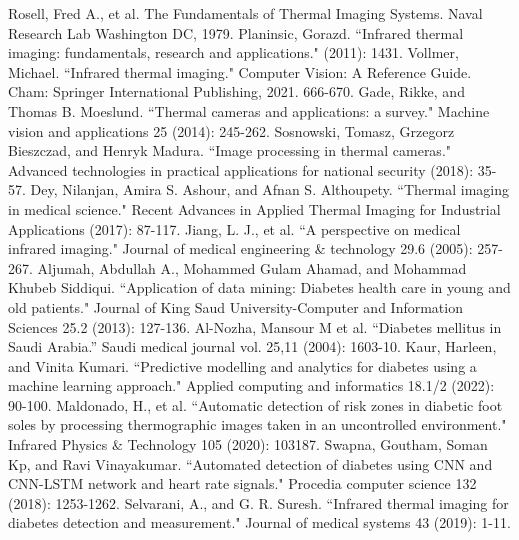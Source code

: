 
\begin{thebibliography}{00}
 Rosell, Fred A., et al. The Fundamentals of Thermal Imaging Systems. Naval Research Lab Washington DC, 1979.
 Planinsic, Gorazd. ``Infrared thermal imaging: fundamentals, research and applications." (2011): 1431.
 Vollmer, Michael. ``Infrared thermal imaging." Computer Vision: A Reference Guide. Cham: Springer International Publishing, 2021. 666-670.
 Gade, Rikke, and Thomas B. Moeslund. ``Thermal cameras and applications: a survey." Machine vision and applications 25 (2014): 245-262.
 Sosnowski, Tomasz, Grzegorz Bieszczad, and Henryk Madura. ``Image processing in thermal cameras." Advanced technologies in practical applications for national security (2018): 35-57.
 Dey, Nilanjan, Amira S. Ashour, and Afnan S. Althoupety. ``Thermal imaging in medical science." Recent Advances in Applied Thermal Imaging for Industrial Applications (2017): 87-117.
 Jiang, L. J., et al. ``A perspective on medical infrared imaging." Journal of medical engineering \& technology 29.6 (2005): 257-267.
 Aljumah, Abdullah A., Mohammed Gulam Ahamad, and Mohammad Khubeb Siddiqui. ``Application of data mining: Diabetes health care in young and old patients." Journal of King Saud University-Computer and Information Sciences 25.2 (2013): 127-136.
 Al-Nozha, Mansour M et al. ``Diabetes mellitus in Saudi Arabia.” Saudi medical journal vol. 25,11 (2004): 1603-10.
 Kaur, Harleen, and Vinita Kumari. ``Predictive modelling and analytics for diabetes using a machine learning approach." Applied computing and informatics 18.1/2 (2022): 90-100.
 Maldonado, H., et al. ``Automatic detection of risk zones in diabetic foot soles by processing thermographic images taken in an uncontrolled environment." Infrared Physics \& Technology 105 (2020): 103187.
 Swapna, Goutham, Soman Kp, and Ravi Vinayakumar. ``Automated detection of diabetes using CNN and CNN-LSTM network and heart rate signals." Procedia computer science 132 (2018): 1253-1262.
 Selvarani, A., and G. R. Suresh. ``Infrared thermal imaging for diabetes detection and measurement." Journal of medical systems 43 (2019): 1-11.

\end{thebibliography}
